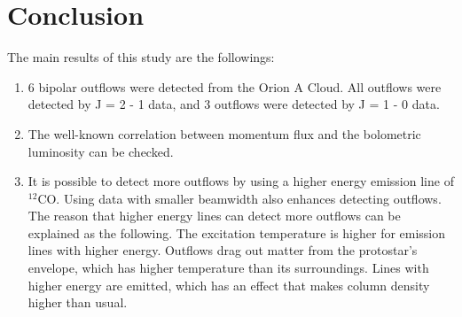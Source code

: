 \newpage

\section{Conclusion}
The main results of this study are the followings:
\begin{enumerate}
	\item 6 bipolar outflows were detected from the Orion A Cloud. All outflows were detected by J = 2 - 1 data, and 3 outflows were detected by J = 1 - 0 data.
	\item The well-known correlation between momentum flux and the bolometric luminosity can be checked.
	\item It is possible to detect more outflows by using a higher energy emission line of $^{12}$CO. Using data with smaller beamwidth also enhances detecting outflows. The reason that higher energy lines can detect more outflows can be explained as the following. The excitation temperature is higher for emission lines with higher energy. Outflows drag out matter from the protostar's envelope, which has higher temperature than its surroundings. Lines with higher energy are emitted, which has an effect that makes column density higher than usual.
	
\end{enumerate}